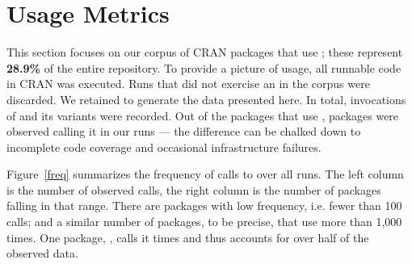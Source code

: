 \documentclass[screen,acmsmall]{acmart}
\begin{document}
\section{Usage Metrics}

This section focuses on our corpus of \Corpus CRAN packages that use
\eval; these represent {\bf 28.9\%} of the entire repository. To provide %
a picture of \eval usage, all runnable code in CRAN was executed. Runs
that did not exercise an \eval in the corpus were discarded. We
retained \Nbruns to generate the data presented here. In total,
\Allcalls invocations of \eval and its variants were recorded. Out of
the \Staticatleastonecallsite packages that use \eval, \Triggeredpkgs
packages were observed calling it in our runs --- the difference can
be chalked down to incomplete code coverage and occasional
infrastructure failures.


Figure~\ref{freq} summarizes the frequency of calls to \eval over all
runs. The left column is the number of observed calls, the right
column is the number of packages falling in that range. There are
\Fewcalls packages with low \eval frequency, i.e. fewer than 100
calls; and a similar number of packages, \Manycalls to be precise,
that use \eval more than 1,000 times. One package, \Maxcallspack,
calls it \Maxcalls times and thus accounts for over half of the
observed data.
\end{document}
